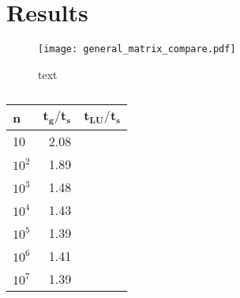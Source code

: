 \section{Results}
\label{sec:results}


%
%

\begin{figure}[htbp]
	\centering
	\texttt{[image: general\_matrix\_compare.pdf]}
	\label{fig:compare}
	\caption{text}
\end{figure}

\begin{table}[htbp]
	\centering
	\begin{tabular}{lrr}
		\textbf{n} & $\mathbf{{t_g}/{t_s}}$ & $\mathbf{{t_{LU}}/{t_s}}$  \\
		\midrule
		\addlinespace[0.1cm]
		
		10         & 2.08                                                                                          &                                                                                         \\
		$10^2$       & 1.89                                                                                          &                                                                                         \\
		$10^3$       & 1.48                                                                                          &                                                                                         \\
		$10^4$       & 1.43                                                                                          &                                                                                         \\
		$10^5$       & 1.39                                                                                          &                                                                                         \\
		$10^6$       & 1.41                                                                                          &                                                                                         \\
		$10^7$       & 1.39                                                                                          &                                                                                        
	\end{tabular} \label{table:time} \caption{}
\end{table} 
